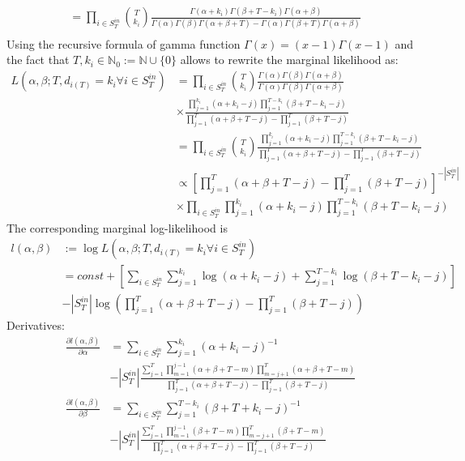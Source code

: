 \documentclass[a4paper, 12pt]{article}
\begin{document}
\begin{itemize}
\begin{align*}
        &= \prod_{i \in S_T^{in}} \binom{T}{k_i} \frac{\Gamma(\alpha + k_i)\Gamma(\beta + T - k_i)\Gamma(\alpha + \beta)}{\Gamma(\alpha)\Gamma(\beta)\Gamma(\alpha + \beta + T) - \Gamma(\alpha)\Gamma(\beta + T)\Gamma(\alpha + \beta)}\\
    \end{align*}
    Using the recursive formula of gamma function $\Gamma(x) = (x - 1)\Gamma(x - 1)$ and the fact that $T, k_i \in \mathbb{N}_0 := \mathbb{N} \cup \{0\}$ allows to rewrite the marginal likelihood as:
    \begin{align*}
        L(\alpha, \beta; T, d_{i(T)} = k_i \forall i \in S_T^{in}) &= \prod_{i \in S_T^{in}} \binom{T}{k_i} \frac{\Gamma(\alpha) \Gamma(\beta) \Gamma(\alpha + \beta)}{\Gamma(\alpha)\Gamma(\beta)\Gamma(\alpha + \beta)}\\
        &\times \frac{\prod_{j=1}^{k_i} (\alpha + k_i - j)\prod_{j=1}^{T - k_i} (\beta + T - k_i - j)}{\prod_{j=1}^T(\alpha + \beta + T - j) - \prod_{j=1}^T (\beta + T - j)} \\
        &= \prod_{i \in S_T^{in}} \binom{T}{k_i} \frac{\prod_{j=1}^{k_i} (\alpha + k_i - j) \prod_{j=1}^{T - k_i} (\beta + T - k_i - j)}{\prod_{j=1}^T (\alpha + \beta + T - j) - \prod_{j=1}^T (\beta + T - j )}\\
        &\propto \left[\prod_{j=1}^T (\alpha + \beta + T - j) - \prod_{j=1}^T (\beta + T - j)\right]^{-|S_T^{in}|}\\
        &\times   \prod_{i \in S_T^{in}} \prod_{j=1}^{k_i} (\alpha + k_i - j)  \prod_{j=1}^{T - k_i} (\beta + T - k_i - j)
    \end{align*}
    The corresponding marginal log-likelihood is
    \begin{align}
        l(\alpha, \beta) &:= \log L(\alpha, \beta; T, d_{i(T)} = k_i \forall i \in S_T^{in}) \nonumber \\
        &= const + \left[\sum_{i \in S_T^{in}} \sum_{j = 1}^{k_i} \log(\alpha + k_i - j) + \sum_{j = 1}^{T - k_i} \log(\beta + T - k_i - j)\right] \nonumber\\
        &- |S_T^{in}|\log\left(\prod_{j=1}^T (\alpha + \beta + T - j) - \prod_{j=1}^T (\beta + T - j)\right)
    \end{align}
    Derivatives:
    \begin{align}
        \frac{\partial l(\alpha, \beta)}{\partial \alpha} &= \sum_{i \in S_T^{in}} \sum_{j = 1}^{k_i} (\alpha + k_i - j)^{-1} \nonumber \\
        &- |S_T^{in}|\frac{\sum_{j = 1}^T \prod_{m = 1}^{j - 1} (\alpha + \beta + T - m) \prod_{m = j + 1}^T (\alpha + \beta + T - m)}{\prod_{j=1}^T (\alpha + \beta + T - j) - \prod_{j=1}^T (\beta + T - j)}\\
        \frac{\partial l(\alpha, \beta)}{\partial \beta} &= \sum_{i \in S_T^{in}} \sum_{j = 1}^{T - k_i} (\beta + T + k_i - j)^{-1} \nonumber \\
        &- |S_T^{in}|\frac{\sum_{j = 1}^T \prod_{m = 1}^{j - 1} (\beta + T - m) \prod_{m = j + 1}^T (\beta + T - m)}{\prod_{j=1}^T (\alpha + \beta + T - j) - \prod_{j=1}^T (\beta + T - j)}
    \end{align}
\end{itemize}
\end{document}
